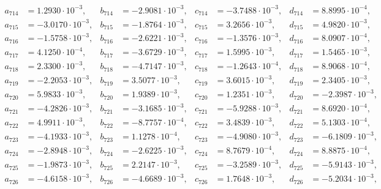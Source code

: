 \begin{align*}
  a_{ 714 } &= 1.2930 \cdot 10^{ -3 }, & b_{ 714 } &= -2.9081 \cdot 10^{ -3 }, & c_{ 714 } &= -3.7488 \cdot 10^{ -3 }, & d_{ 714 } &= 8.8995 \cdot 10^{ -4 }, \\ 
  a_{ 715 } &= -3.0170 \cdot 10^{ -3 }, & b_{ 715 } &= -1.8764 \cdot 10^{ -3 }, & c_{ 715 } &= 3.2656 \cdot 10^{ -3 }, & d_{ 715 } &= 4.9820 \cdot 10^{ -3 }, \\ 
  a_{ 716 } &= -1.5758 \cdot 10^{ -3 }, & b_{ 716 } &= -2.6221 \cdot 10^{ -3 }, & c_{ 716 } &= -1.3576 \cdot 10^{ -3 }, & d_{ 716 } &= 8.0907 \cdot 10^{ -4 }, \\ 
  a_{ 717 } &= 4.1250 \cdot 10^{ -4 }, & b_{ 717 } &= -3.6729 \cdot 10^{ -3 }, & c_{ 717 } &= 1.5995 \cdot 10^{ -3 }, & d_{ 717 } &= 1.5465 \cdot 10^{ -3 }, \\ 
  a_{ 718 } &= 2.3300 \cdot 10^{ -3 }, & b_{ 718 } &= -4.7147 \cdot 10^{ -3 }, & c_{ 718 } &= -1.2643 \cdot 10^{ -4 }, & d_{ 718 } &= 8.9068 \cdot 10^{ -4 }, \\ 
  a_{ 719 } &= -2.2053 \cdot 10^{ -3 }, & b_{ 719 } &= 3.5077 \cdot 10^{ -3 }, & c_{ 719 } &= 3.6015 \cdot 10^{ -3 }, & d_{ 719 } &= 2.3405 \cdot 10^{ -3 }, \\ 
  a_{ 720 } &= 5.9833 \cdot 10^{ -3 }, & b_{ 720 } &= 1.9389 \cdot 10^{ -3 }, & c_{ 720 } &= 1.2351 \cdot 10^{ -3 }, & d_{ 720 } &= -2.3987 \cdot 10^{ -3 }, \\ 
  a_{ 721 } &= -4.2826 \cdot 10^{ -3 }, & b_{ 721 } &= -3.1685 \cdot 10^{ -3 }, & c_{ 721 } &= -5.9288 \cdot 10^{ -3 }, & d_{ 721 } &= 8.6920 \cdot 10^{ -4 }, \\ 
  a_{ 722 } &= 4.9911 \cdot 10^{ -3 }, & b_{ 722 } &= -8.7757 \cdot 10^{ -4 }, & c_{ 722 } &= 3.4839 \cdot 10^{ -3 }, & d_{ 722 } &= 5.1303 \cdot 10^{ -4 }, \\ 
  a_{ 723 } &= -4.1933 \cdot 10^{ -3 }, & b_{ 723 } &= 1.1278 \cdot 10^{ -4 }, & c_{ 723 } &= -4.9080 \cdot 10^{ -3 }, & d_{ 723 } &= -6.1809 \cdot 10^{ -3 }, \\ 
  a_{ 724 } &= -2.8948 \cdot 10^{ -3 }, & b_{ 724 } &= -2.6225 \cdot 10^{ -3 }, & c_{ 724 } &= 8.7679 \cdot 10^{ -4 }, & d_{ 724 } &= 8.8875 \cdot 10^{ -4 }, \\ 
  a_{ 725 } &= -1.9873 \cdot 10^{ -3 }, & b_{ 725 } &= 2.2147 \cdot 10^{ -3 }, & c_{ 725 } &= -3.2589 \cdot 10^{ -3 }, & d_{ 725 } &= -5.9143 \cdot 10^{ -3 }, \\ 
  a_{ 726 } &= -4.6158 \cdot 10^{ -3 }, & b_{ 726 } &= -4.6689 \cdot 10^{ -3 }, & c_{ 726 } &= 1.7648 \cdot 10^{ -3 }, & d_{ 726 } &= -5.2034 \cdot 10^{ -3 }, \\ 

\end{align*}
